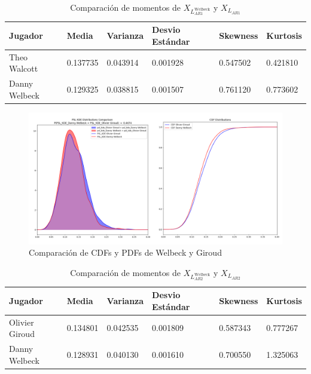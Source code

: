 \documentclass[
  a4paper,
]{article}
\begin{document}
\begin{table}
\caption{Comparación de momentos de $X_{L_{AR1}^{\text{Welbeck}}}$ y $X_{L_{AR1}}$}
\label{tab:comparacion_momentos_psl_Welbeck_Walcott}
\begin{center}
\begin{tabular}{llllll}
\toprule
Jugador & Media & Varianza & Desvio Estándar & Skewness & Kurtosis \\
\midrule
Theo Walcott  &  0.137735 &  0.043914 &         0.001928 &  0.547502 &  0.421810 \\
Danny Welbeck &  0.129325 &  0.038815 &         0.001507 &  0.761120 &  0.773602 \\
\bottomrule
\end{tabular}
\end{center}
\end{table}

\begin{figure}
  \includegraphics{recursos_pdf/graficos/Welbeck_Giroud.png}
    \caption{Comparación de CDFs y PDFs de Welbeck y Giroud}
\end{figure}

\begin{table}
\caption{Comparación de momentos de $X_{L_{AR2}^{\text{Welbeck}}}$ y $X_{L_{AR2}}$}
\label{tab:comparacion_momentos_psl_Welbeck_Giroud}
\begin{center}
\begin{tabular}{llllll}
\toprule
Jugador & Media & Varianza & Desvio Estándar & Skewness & Kurtosis \\
\midrule
Olivier Giroud &  0.134801 &  0.042535 &         0.001809 &  0.587343 &  0.777267 \\
Danny Welbeck  &  0.128931 &  0.040130 &         0.001610 &  0.700550 &  1.325063 \\
\bottomrule
\end{tabular}
\end{center}
\end{table}
\end{document}
